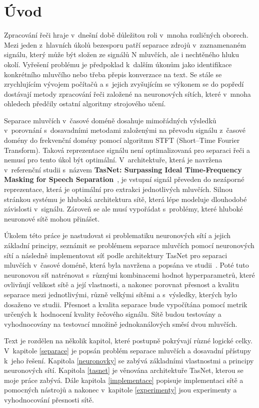 \chapter{Úvod}
Zpracování řeči hraje v~dnešní době důležitou roli v~mnoha rozličných oborech. Mezi jeden z~hlavních úkolů bezesporu patří separace zdrojů v~zaznamenaném signálu, který může být složen ze signálů N mluvčích, ale i nechtěného hluku okolí. Vyřešení problému je předpoklad k~dalším úkonům jako identifikace konkrétního mluvčího nebo třeba přepis konverzace na text. Se stále se zrychlujícím vývojem počítačů a s~jejich zvyšujícím se výkonem se do popředí dostávají metody zpracování řeči založené na neuronových sítích, které v~mnoha ohledech předčily ostatní algoritmy strojového učení.

Separace mluvčích v~časové doméně dosahuje mimořádných výsledků v~porovnání s~dosavadními metodami  založenými na převodu signálu z~časové domény do frekvenční domény pomocí algoritmu STFT (Short--Time Fourier Transform). Taková reprezentace signálu není optimalizovaná pro separaci řeči a nemusí pro tento úkol být optimální. V~architektuře, která je navržena v~referenční studii s~názvem \textbf{TasNet: Surpassing Ideal Time-Frequency Masking for Speech Separation}~\cite{luo2018convtasnet}, je vstupní signál převeden do nezáporné reprezentace, která je optimální pro extrakci jednotlivých mluvčích. Silnou stránkou systému je hluboká architektura sítě, která lépe modeluje dlouhodobé závislosti v~signálu. Zároveň se ale musí vypořádat s~problémy, které hluboké neuronové sítě mohou přinášet.

Úkolem této práce je nastudovat si problematiku neuronových sítí a jejich základní principy, seznámit se problémem separace mluvčích pomocí neuronových sítí a následně implementovat síť podle architektury TasNet pro separaci mluvčích v~časové doméně, která byla navržena a popsána ve studii~\cite{luo2018convtasnet}. Poté tuto neuronovou síť natrénovat s~různými kombinacemi hodnot hyperparametrů, které ovlivňují velikost sítě a její vlastnosti, a nakonec porovnat přesnost a kvalitu separace mezi jednotlivými, různě velkými sítěmi a s~výsledky, kterých bylo dosaženo ve studii. Přesnost a kvalita separace bude vypočítána pomocí metrik určených k~hodnocení kvality řečového signálu. Sítě budou testovány a vyhodnocovány na testovací množině jednokanálových směsí dvou mluvčích.

Text je rozdělen na několik kapitol, které postupně pokrývají různé logické celky. V~kapitole \ref{separace} je popsán problém separace mluvčích a dosavadní přístupy k~jeho řešení. Kapitola \ref{neuronovky} se zabývá základními vlastnostmi a principy neuronových sítí. Kapitola \ref{tasnet} je věnována architektuře TasNet, kterou se moje práce zabývá. Dále kapitola \ref{implementace} popisuje implementaci sítě a pomocných nástrojů a nakonec v~kapitole \ref{experimenty} jsou experimenty a vyhodnocování přesnosti sítě.



